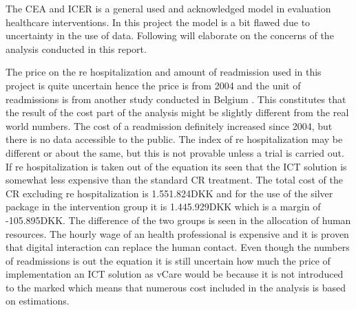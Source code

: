 The CEA and ICER is a general used and acknowledged model in evaluation healthcare interventions.  In this project the model is a bit flawed due to uncertainty in the use of data.  Following will elaborate on the concerns of the analysis conducted in this report. 

The price on the re hospitalization and amount of readmission used in this project is quite uncertain hence the price is from 2004 and the unit of readmissions is from another study conducted in Belgium \cite{costeffect, rasmussen2011hjerterehabilitering}. This constitutes that the result of the cost part of the analysis might be slightly different from the real world numbers. The cost of a readmission definitely increased since 2004, but there is no data accessible to the public. The index of re hospitalization may be different or about the same, but this is not provable unless a trial is carried out. 
If re hospitalization is taken out of the equation its seen that the ICT solution is somewhat less expensive than the standard CR treatment. The total cost of the CR excluding re hospitalization is 1.551.824DKK and for the use of the silver package in the intervention group it is 1.445.929DKK which is a margin of -105.895DKK. The difference of the two groups is seen in the allocation of human resources. The hourly wage of an health professional is expensive and it is proven that digital interaction can replace the human contact. Even though the numbers of readmissions is out the equation it is still uncertain how much the price of implementation an ICT solution as vCare would be because it is not introduced to the marked which means that numerous cost included in the analysis is based on estimations. 

